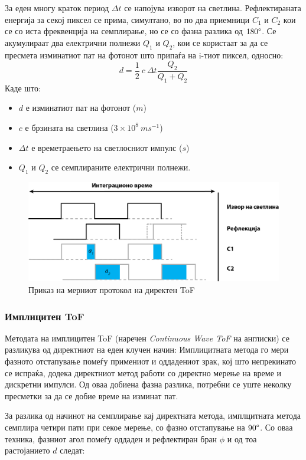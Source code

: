 \documentclass[12pt]{article}
\begin{document}
		За еден многу краток период $ \Delta t $ се напојува изворот на светлина. Рефлектираната енергија за секој пиксел се прима, симултано, во по два приемници $C_1$ и $C_2$ кои се со иста фреквенција на семплирање, но се со фазна разлика од $180 \degree$. Се акумулираат два електрични полнежи $Q_1$ и  $Q_2$, кои се користаат за да се пресмета изминатиот пат на фотонот што припаѓа на i-тиот пиксел, односно:
		$$ d = \frac{1}{2} \ c\  \Delta t \frac{Q_2}{Q_1 + Q_2} $$
		Каде што:
		\begin{itemize}
			\item $d$ е изминатиот пат на фотонот ($m$)
			\item $c$ е брзината на светлина ($ 3 \times 10^8\ ms^{-1} $)
			\item $\Delta t$ е времетраењето на светлосниот импулс ($s$)
			\item $Q_1$ и $Q_2$ се семплираните електрични полнежи.
			\end{itemize}

		\begin{figure}[H]
			\includegraphics[width=0.75\linewidth]{./images/impulseToF.png}
			\centering
			\caption{Приказ на мерниот протокол на директен ToF \cite{tofwhitepaper}}
			\label{fig:impulseToF.png}
			\end{figure}

	     \subsubsection{Имплицитен ToF}
		Методата на имплицитен ToF (наречен \textit{Continuous Wave ToF} на англиски) се разликува од директниот на еден клучен начин: Имплицитната метода го мери фазното отстапување помеѓу примениот и оддадениот зрак, кој што непрекинато се испраќа, додека директниот метод работи со директно мерење на време и дискретни импулси. Од оваа добиена фазна разлика, потребни се уште неколку пресметки за да се добие време на изминат пат.

		За разлика од начинот на семплирање кај директната метода, имплцитната метода семплира четири пати при секое мерење, со фазно отстапување на $90\degree$. Со оваа техника, фазниот агол помеѓу оддаден и рефлектиран бран $\phi$ и од тоа растојанието $d$ следат:
\end{document}
